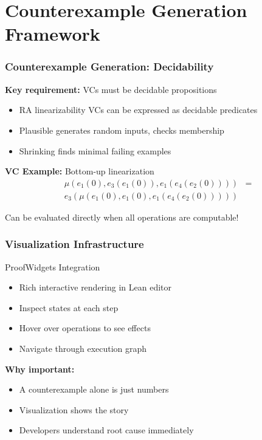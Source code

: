 \documentclass[usepdftitle=false]{beamer}
\begin{document}
\section{Counterexample Generation Framework}

\begin{frame}
  \frametitle{Counterexample Generation: Decidability}
  
  \textbf{Key requirement:} VCs must be decidable propositions
  
  \begin{itemize}
    \item RA linearizability VCs can be expressed as decidable predicates
    \item Plausible generates random inputs, checks membership
    \item Shrinking finds minimal failing examples
  \end{itemize}
  
  \vspace{0.3cm}
  \textbf{VC Example:} Bottom-up linearization
  \begin{align*}
    \mu(e_1(0), e_3(e_1(0)), e_1(e_4(e_2(0)))) &= \\
    e_3(\mu(e_1(0), e_1(0), e_1(e_4(e_2(0)))))
  \end{align*}
  
  \small Can be evaluated directly when all operations are computable!
\end{frame}

\begin{frame}
  \frametitle{Visualization Infrastructure}
  
  \begin{block}{ProofWidgets Integration}
    \begin{itemize}
      \item Rich interactive rendering in Lean editor
      \item Inspect states at each step
      \item Hover over operations to see effects
      \item Navigate through execution graph
    \end{itemize}
  \end{block}
  
  \vspace{0.3cm}
  \textbf{Why important:}
  \begin{itemize}
    \item A counterexample alone is just numbers
    \item Visualization shows the story
    \item Developers understand root cause immediately
  \end{itemize}
\end{frame}
\end{document}
